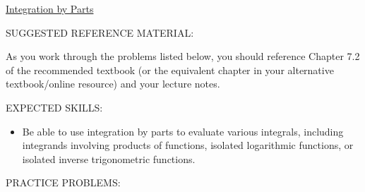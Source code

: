 \documentclass[12pt]{article}
\begin{document}
\begin{center}
\underline{\LARGE{Integration by Parts}}
\end{center}

\noindent SUGGESTED REFERENCE MATERIAL:

\bigskip

\noindent As you work through the problems listed below, you should reference Chapter 7.2 of the recommended textbook (or the equivalent chapter in your alternative textbook/online resource) and your lecture notes.

\bigskip

\noindent EXPECTED SKILLS:

\begin{itemize}

\item Be able to use integration by parts to evaluate various integrals, including integrands involving products of functions, isolated logarithmic functions, or isolated inverse trigonometric functions.

\end{itemize}

\noindent PRACTICE PROBLEMS:

\medskip

\end{document}
